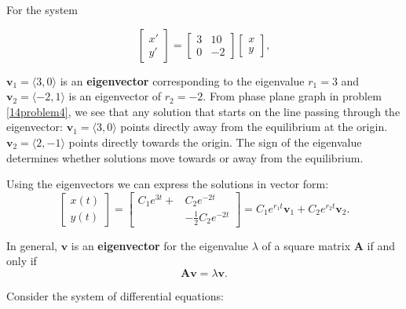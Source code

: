 \clearpage
{}
For the system 

\[ \left[ \begin{array}{c} x' \\ y' \end{array} \right] =
\left[ \begin{array}{cc} 3 & 10 \\ 0 & -2 \end{array} \right]
\left[ \begin{array}{c} x\\ y \end{array} \right], \]

$\mathbf{v}_1=\langle 3, 0 \rangle$ is an \textbf{eigenvector} corresponding to the eigenvalue $r_1 = 3$ and $\mathbf{v}_2=\langle -2, 1 \rangle$ is an eigenvector of $r_2=-2$. From phase plane graph in problem \ref{14problem4}, we see that any solution that starts on the line passing through the eigenvector:
\bi
\ii $\mathbf{v}_1=\langle 3, 0 \rangle$ points directly away from the equilibrium at the origin.
\ii $\mathbf{v}_2=\langle 2, -1 \rangle$ points directly towards the origin.
\ii The sign of the eigenvalue determines whether solutions move towards or away from the equilibrium.
\ei

Using the eigenvectors we can express the solutions in vector form:
\[  \left[ \begin{array}{c} x(t) \\ y(t) \end{array} \right] =
\left[ \begin{array}{rl}
C_1e^{3t}+&C_2e^{-2t}  \\
 &- \frac{1}{2}C_2e^{-2t}
\end{array} \right]  =
C_1e^{r_1t} \mathbf{v}_1+ C_2 e^{r_2t} \mathbf{v}_2. \]

In general, $\mathbf{v}$ is an \textbf{eigenvector} for the eigenvalue $\lambda$ of a square matrix $\mathbf{A}$ if and only if
\[ \mathbf{A} \mathbf{v} = \lambda \mathbf{v}. \]

\clearpage
{}

\bb[resume]
\ii Consider the system of differential equations:



